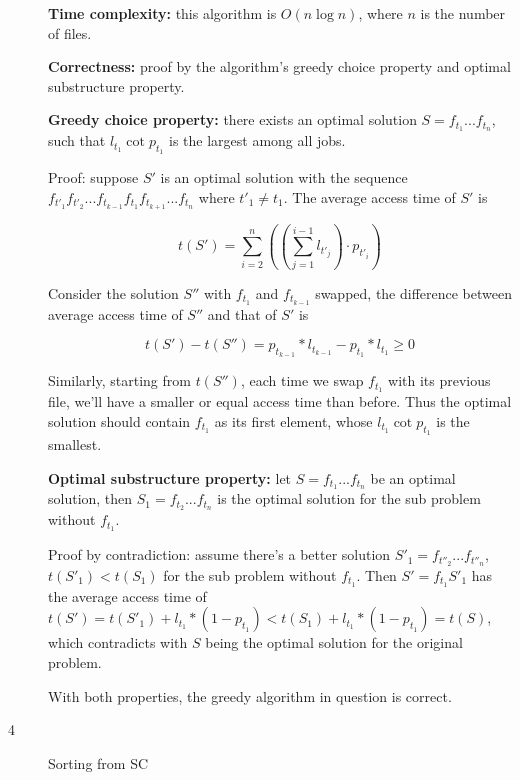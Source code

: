 \documentclass{article}
\begin{document}
\begin{description}
\begin{algorithm}[h]
\begin{algorithmic}[1]
    \end{algorithmic}
  \end{algorithm}

  \textbf{Time complexity:} this algorithm is $O(n \log n)$, where $n$ is the number of files.

  \textbf{Correctness:} proof by the algorithm's greedy choice property and optimal substructure property.

  \textbf{Greedy choice property:} there exists an optimal solution $S=f_{t_1}...f_{t_n}$, such that $l_{t_1} \cot p_{t_1}$ is the largest among all jobs.

  Proof: suppose $S'$ is an optimal solution with the sequence $f_{t'_1}f_{t'_2}...f_{t_{k-1}}f_{t_1}f_{t_{k+1}}...f_{t_n}$ where $t'_1 \neq t_1$. The average access time of $S'$ is 

  $$t(S') = \sum_{i=2}^{n}{((\sum_{j=1}^{i-1}{l_{t'_j}}) \cdot p_{t'_i})}$$

  Consider the solution $S''$ with $f_{t_1}$ and $f_{t_{k-1}}$ swapped, the difference between average access time of $S''$ and that of $S'$ is

  $$t(S') - t(S'') = p_{t_{k-1}} * l_{t_{k-1}} - p_{t_1} * l_{t_1} \geq 0$$

  Similarly, starting from $t(S'')$, each time we swap $f_{t_1}$ with its previous file, we'll have a smaller or equal access time than before. Thus the optimal solution should contain $f_{t_1}$ as its first element, whose $l_{t_1} \cot p_{t_1}$ is the smallest.

  \textbf{Optimal substructure property:} let $S=f_{t_1}...f_{t_n}$ be an optimal solution, then $S_1=f_{t_2}...f_{t_n}$ is the optimal solution for the sub problem without $f_{t_1}$.

  Proof by contradiction: assume there's a better solution $S'_1=f_{t''_2}...f_{t''_n}$, $t(S'_1)<t(S_1)$ for the sub problem without $f_{t_1}$. Then $S'=f_{t_1}S'_1$ has the average access time of $t(S')=t(S'_1) + l_{t_1} * (1-p_{t_1}) < t(S_1) + l_{t_1} * (1-p_{t_1}) = t(S)$, which contradicts with $S$ being the optimal solution for the original problem.

  With both properties, the greedy algorithm in question is correct.

\item[4]{Sorting from SC}
  

\end{description}
\end{document}
